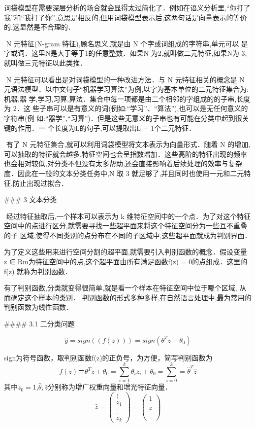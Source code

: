​	词袋模型在需要深层分析的场合就会显得太过简化了．例如在语义分析里,“你打了 我”和“我打了你”,意思是相反的,但用词袋模型表示后,这两句话是向量表示的等价 的,这显然是不合理的．

​	N 元特征(N-gram 特征),顾名思义,就是由 N 个字或词组成的字符串,单元可以 是字或词．这里N是大于等于1的任意整数．如果N 为2,就叫做二元特征,如果N为 3,就叫做三元特征以此类推．

​	N 元特征可以看出是对词袋模型的一种改进方法．与 N 元特征相关的概念是 N 元语法模型．以中文句子“机器学习算法”为例,以字为基本单位的二元特征集合为:{机器,器 学,学习,习算,算法}．集合中每一项都是由二个相邻的字组成的的子串,长度为 2．这 些子串可以是有意义的词(例如:“学习”、“算法”),也可以是无任何意义的字符串(例 如:“器学”,“习算”)．但是这些无意义的子串也有可能在分类中起到很关键的作用．一 个长度为L的句子,可以提取出L − 1个二元特征．

​	有了 N 元特征集合,就可以利用词袋模型将文本表示为向量形式．随着 N 的增加, 可以抽取的特征就会越多,特征空间也会呈指数增加．这些高阶的特征出现的频率也会相对较低,对分类不但没有太多帮助,还会直接影响着后续处理的效率与复杂度．因此在一般的文本分类任务中,N 取 3 就足够了,并且同时也使用一元和二元特征,防止出现过拟合．

### 3 文本分类

​	经过特征抽取后,一个样本可以表示为 k 维特征空间中的一个点．为了对这个特征 空间中的点进行区分,就需要寻找一些超平面来将这个特征空间分为一些互不重叠的子 区域,使得不同类别的点分布在不同的子区域中,这些超平面就成为判别界面．

​	为了定义这些用来进行空间分割的超平面,就需要引入判别函数的概念．假设变量 z ∈ Rm为特征空间中的点,这个超平面由所有满足函数f(z) = 0的点组成．这里的f(z) 就称为判别函数．

​	有了判别函数,分类就变得很简单,就是看一个样本在特征空间中位于哪个区域, 从而确定这个样本的类别．  判别函数的形式多种多样,在自然语言处理中,最为常用的判别函数为线性函数．

#### 3.1 二分类问题

$$
\hat y =sign((f(z))) = sign(\theta^Tz+\theta_0)
$$

sign为符号函数，取判别函数f(z)的正负号，为方便，简写判别函数为
$$
f(z) ＝ \theta^Tz+\theta_0 = \sum_{i=1}^{k}\theta_iz_i + \theta_0 = \sum_{i=0}^{k} = \hat \theta^T \hat z
$$
其中$z_0=1$,$\hat\theta,\hat z$分别称为增广权重向量和增光特征向量．
$$
\hat z = \left( 
		\begin{array} {ccc} 1 \\  z_1\\ .\\ .\\  z_k
		\end{array}
        	\right) =  \left( 
        	\begin{array}{ccc}
		1 \\ \\ z \\ \\  \\  
		\end{array}
        	\right)
$$

